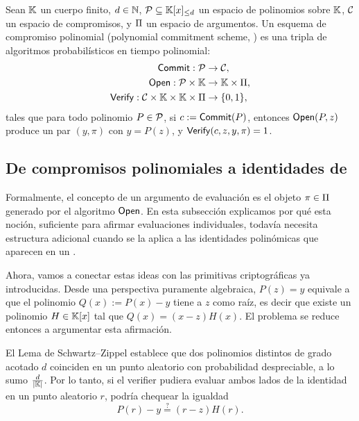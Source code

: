 \begin{definition}[\PCS]
\label{def:apendice-b-commitment-schemes-pcs}
	Sean $\mathbb{K}$ un cuerpo finito, $d \in \mathbb{N}$, $\mathcal{P} \subseteq \mathbb{K}[x]_{\leq d}$ un espacio de polinomios sobre $\mathbb{K}$, $\mathcal{C}$ un espacio de compromisos, y $\Pi$ un espacio de argumentos. Un esquema de compromiso polinomial (polynomial commitment scheme, \PCS) es una tripla de algoritmos probabilísticos en tiempo polinomial:
	$$
	\begin{aligned}
		\mathsf{Commit}: \mathcal{P} &\to \mathcal{C}, \\
		\mathsf{Open}: \mathcal{P} \times \mathbb{K} &\to \mathbb{K} \times \Pi, \\
		\mathsf{Verify}: \mathcal{C} \times \mathbb{K} \times \mathbb{K} \times \Pi &\to \{0,1\},
	\end{aligned}
	$$
	tales que para todo polinomio $P \in \mathcal{P}$, si $c := \mathsf{Commit}(P)$, entonces
	$\mathsf{Open}(P, z)$ produce un par $(y, \pi)$ con $y = P(z)$, y $\mathsf{Verify}(c, z, y, \pi) = 1$.
\end{definition}

\subsection{De compromisos polinomiales a identidades de \QAP}
\label{subsec:apendice-b-commitment-schemes-de-compromisos-polinomiales-a-identidades-de-qap}

Formalmente, el concepto de un argumento de evaluación es el objeto $\pi \in \Pi$ generado por el algoritmo $\mathsf{Open}$. En esta subsección explicamos por qué esta noción, suficiente para afirmar evaluaciones individuales, todavía necesita estructura adicional cuando se la aplica a las identidades polinómicas que aparecen en un \QAP.

Ahora, vamos a conectar estas ideas con las primitivas criptográficas ya introducidas. Desde una perspectiva puramente algebraica, $P(z) = y$ equivale a que el polinomio $Q(x) := P(x) - y$ tiene a $z$ como raíz, es decir que existe un polinomio $H \in \mathbb{K}[x]$ tal que $Q(x) = (x - z)H(x)$. El problema se reduce entonces a argumentar esta afirmación.

El Lema de Schwartz–Zippel establece que dos polinomios distintos de grado acotado $d$ coinciden en un punto aleatorio con probabilidad despreciable, a lo sumo $\frac{d}{|\mathbb{K}|}$. Por lo tanto, si el verifier pudiera evaluar ambos lados de la identidad en un punto aleatorio $r$, podría chequear la igualdad
$$P(r) - y \overset{?}{=} (r - z)H(r).$$


